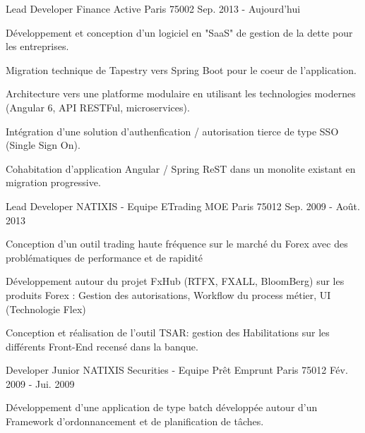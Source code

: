\begin{cventries}
  \cventry
    {Lead Developer}
    {Finance Active}
    {Paris 75002}
    {Sep. 2013 - Aujourd'hui}
    {
      \begin{cvitems}
      	\item {Développement et conception d'un logiciel en "SaaS" de gestion de la dette pour les entreprises.}
        \item {Migration technique de Tapestry vers Spring Boot pour le coeur de l'application.}
         \item {Architecture vers une platforme modulaire en utilisant les technologies modernes (Angular 6, API RESTFul, microservices).}
        \item {Intégration d'une solution d'authenfication / autorisation tierce de type SSO (Single Sign On).}
        \item {Cohabitation d'application Angular / Spring ReST dans un monolite existant en migration progressive.}
      \end{cvitems}
    }
  \cventry
    {Lead Developer}
    {NATIXIS - Equipe ETrading MOE}
    {Paris 75012}
    {Sep. 2009 - Août. 2013}
    {
      \begin{cvitems}
         \item {Conception d'un outil trading haute fréquence sur le marché du Forex avec des problématiques de performance et de rapidité}
         \item {Développement autour du projet FxHub (RTFX, FXALL, BloomBerg) sur les produits Forex : Gestion des autorisations, Workflow du process métier, UI (Technologie Flex)}
        \item {Conception et réalisation de l'outil TSAR: gestion des Habilitations sur les différents Front-End recensé dans la banque.}
      \end{cvitems}
    }
  \cventry
    {Developer Junior}
    {NATIXIS Securities - Equipe Prêt Emprunt}
    {Paris 75012}
    {Fév. 2009 - Jui. 2009}
    {
      \begin{cvitems}
        \item {Développement d’une application de type batch développée autour d’un Framework d’ordonnancement et de planification de tâches.}
      \end{cvitems} 
    }
\end{cventries}
